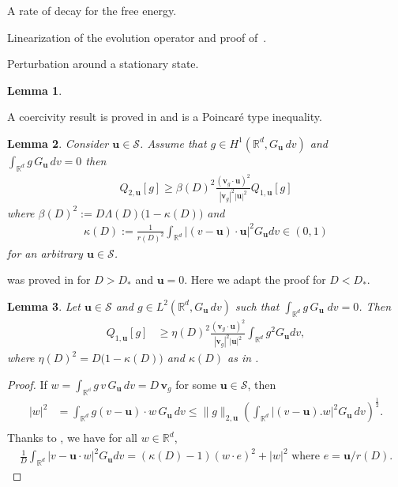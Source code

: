 \documentclass[reqno]{amsart} %
\newtheorem{lemma}{Lemma}[section]
\begin{document}
\begin{section}{A rate of decay for the free energy.}
\begin{section}{Linearization of the evolution operator and proof of~\texorpdfstring{}{thm3}.}
\begin{subsection}{Perturbation around a stationary state.}
\begin{lemma}
\end{lemma}
\end{subsection}
\begin{subsection}{A coercivity result} 
 is proved in \cite[Proposition~3.1]{Li2021} 
 and is a Poincaré type inequality.
\begin{lemma}
\label{lemmeXingyu}
    Consider $\mathbf{u} \in \mathcal{S}$. Assume that $g\in H^1(\mathbb{R}^d,G_\mathbf{u}\,dv)$ and $\int_{\mathbb{R}^d}g\, G_\mathbf{u} \, dv =0$ then
    \begin{align*}
        Q_{2,\mathbf{u}}[g]\geq \beta(D)^2\frac{(\mathbf{v}_g\cdot {\mathbf{u}})^2}{|\mathbf{v}_g|^2|\mathbf{u}|^2} Q_{1,\mathbf{u}}[g]
    \end{align*}
where $\beta(D)^2:= D\Lambda(D)\big(1-\kappa(D)\big)$ and 
\begin{align*}
    \kappa(D):= \frac{1}{r(D)^2} \int_{\mathbb{R}^d}|(v-\mathbf{u})\cdot \mathbf{u}|^2G_\mathbf{u}dv \in (0,1)
\end{align*}
for an arbitrary $\mathbf{u} \in \mathcal{S}$.
\end{lemma}
  was proved in \cite[Lemma~3.1]{Li2021} for $D>D_*$ and $\mathbf{u}=0$. Here we adapt the proof for $D<D_*$.
\begin{lemma}
\label{lemmenormequi}
    Let $\mathbf{u}\in \mathcal{S}$ and $g \in L^2(\mathbb{R}^d,G_{\mathbf{u}}\,dv)$ such that $\int_{\mathbb{R}^d} g\,G_{\mathbf{u}}\;dv=0$. Then 
    \begin{align*}
         Q_{1,\mathbf{u}}[g]
    & \geq \eta(D)^2 \frac{(\mathbf{v}_g\cdot {\mathbf{u}})^2}{|\mathbf{v}_g|^2|\mathbf{u}|^2} \int_{\mathbb{R}^d}g^2G_{\mathbf{u}}dv,
    \end{align*}
where $\eta(D)^2=D\big(1-\kappa(D)\big)$ and $\kappa(D)$ as in .
\end{lemma}
\begin{proof}
   If $w=  \int_{\mathbb{R^d}}g\,v \,G_{\mathbf{u}}\,dv=D\,\mathbf{v}_g$ for some $\mathbf{u}\in \mathcal{S}$, then 
\begin{align*}
   |w|^2
    &= \int_{\mathbb{R}^d}{g(v-\mathbf{u})\cdot w\, G_{\mathbf{u}}\,dv}
    \leq \lVert g \rVert_{2,\mathbf{u}} \left( \int_{\mathbb{R}^d} |(v-\mathbf{u}).w|^2 G_{\mathbf{u}}\,dv\right)^\frac{1}{2}. \\
\end{align*}
Thanks to \cite[Corollary~2.2]{Li2021}, we have for all $w\in \mathbb{R}^d$,
\begin{align*}
    \frac{1}{D} \int_{\mathbb{R}^d}|v-\mathbf{u}\cdot w|^2G_\mathbf{u}dv= (\kappa(D)-1)(w\cdot e)^2+|w|^2 \text{ where } e=\mathbf{u}/r(D).

\end{align*}
\end{proof}
\end{subsection}
\end{section}
\end{section}
\end{document}
